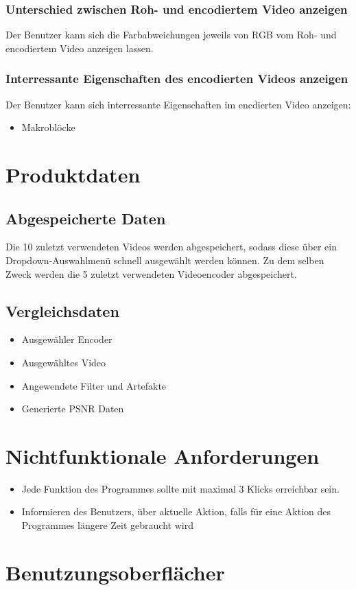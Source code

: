 \documentclass[parskip=full]{scrartcl}
\begin{document}
\subsubsection{Unterschied zwischen Roh- und encodiertem Video anzeigen}
Der Benutzer kann sich die Farbabweichungen jeweils von RGB vom Roh- und encodiertem Video anzeigen lassen.
\subsubsection{Interressante Eigenschaften des encodierten Videos anzeigen}
Der Benutzer kann sich interressante Eigenschaften im encdierten Video anzeigen:
\begin{itemize}
\item Makroblöcke
\end{itemize}
\section{Produktdaten}
\subsection{Abgespeicherte Daten}
Die 10 zuletzt verwendeten Videos werden abgespeichert, sodass diese über ein Dropdown-Auswahlmenü schnell ausgewählt werden können. Zu dem selben Zweck werden die 5 zuletzt verwendeten Videoencoder abgespeichert.
\subsection{Vergleichsdaten}
\begin{itemize}
\item Ausgewähler Encoder
\item Ausgewähltes Video
\item Angewendete Filter und Artefakte
\item Generierte PSNR Daten
\end{itemize}
\section{Nichtfunktionale Anforderungen}
\begin{itemize}
\item Jede Funktion des Programmes sollte mit maximal 3 Klicks erreichbar sein.
\item Informieren des Benutzers, über aktuelle Aktion, falls für eine Aktion des Programmes längere Zeit gebraucht wird
\end{itemize}
\section{Benutzungsoberflächer}
\end{document}
